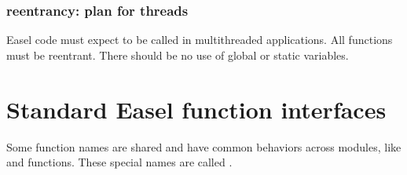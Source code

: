 \subsubsection{reentrancy: plan for threads}

Easel code must expect to be called in multithreaded applications. All
functions must be reentrant. There should be no use of global or
static variables. 





\section{Standard Easel function interfaces}

Some function names are shared and have common behaviors across
modules, like  and  functions.  These
special names are called .

